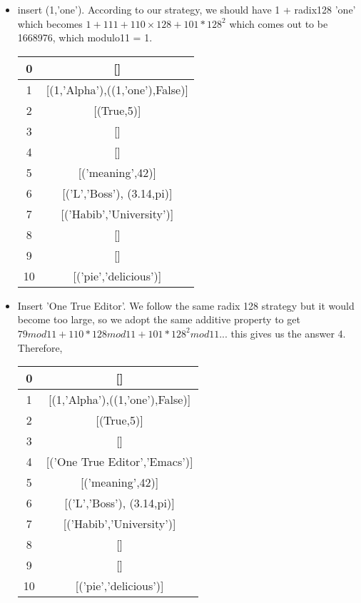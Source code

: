 \documentclass{article}
\begin{document}
\begin{enumerate}
\begin{itemize}
		\item insert (1,'one'). According to our strategy, we should have 1 + radix128 'one' which becomes $1 + 111 + 110 \times 128 + 101*128^2$ which comes out to be 1668976, which modulo11 = 1.
		\begin{center}
			\begin{tabular}{ |c|c| } 
				\hline
				0 & []   \\ 
				\hline
				1 &	[(1,'Alpha'),((1,'one'),False)] \\
				\hline 
				2 & [(True,5)]  \\ 
				\hline
				3&[]\\
				\hline
				4&[]\\
				\hline
				5&[('meaning',42)]\\
				\hline
				6&[('L','Boss'), (3.14,pi)]\\
				\hline
				7&[('Habib','University')]\\
				\hline
				8&[]\\
				\hline
				9&[]\\
				\hline
				10&[('pie','delicious')]\\
				\hline
			\end{tabular}
		\end{center}
	\item Insert 'One True Editor'. We follow the same radix 128 strategy but it would become too large, so we adopt the same additive property to get $79 mod 11  + 110*128 mod 11 + 101*128^2 mod 11 ...$ this gives us the answer 4. Therefore,
		\begin{center}
			\begin{tabular}{ |c|c| } 
				\hline
				0 & []   \\ 
				\hline
				1 &	[(1,'Alpha'),((1,'one'),False)] \\
				\hline 
				2 & [(True,5)]  \\ 
				\hline
				3&[]\\
				\hline
				4&[('One True Editor','Emacs')]\\
				\hline
				5&[('meaning',42)]\\
				\hline
				6&[('L','Boss'), (3.14,pi)]\\
				\hline
				7&[('Habib','University')]\\
				\hline
				8&[]\\
				\hline
				9&[]\\
				\hline
				10&[('pie','delicious')]\\
				\hline
			\end{tabular}

\end{center}
\end{itemize}
\end{enumerate}
\end{document}
